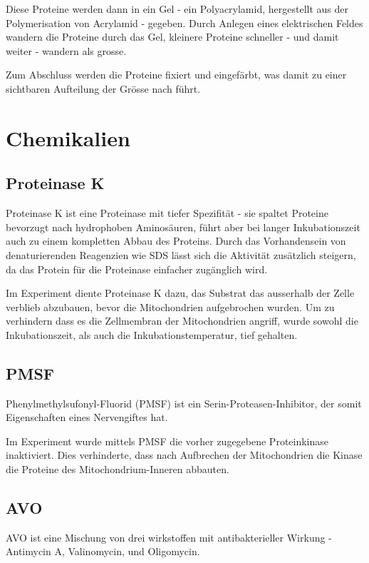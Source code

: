 \documentclass[a4paper,german]{scrreprt}
\begin{document}
Diese Proteine werden dann in ein Gel - ein Polyacrylamid, hergestellt aus der
Polymerisation von Acrylamid - gegeben. Durch Anlegen eines elektrischen Feldes
wandern die Proteine durch das Gel, kleinere Proteine schneller - und damit
weiter - wandern als grosse.

Zum Abschluss werden die Proteine fixiert und eingefärbt, was damit zu einer
sichtbaren Aufteilung der Grösse nach führt.

\chapter{Chemikalien}

\section{Proteinase K}

Proteinase K ist eine Proteinase mit tiefer Spezifität - sie spaltet Proteine
bevorzugt nach hydrophoben Aminosäuren, führt aber bei langer Inkubationszeit
auch zu einem kompletten Abbau des Proteins. Durch das Vorhandensein von
denaturierenden Reagenzien wie SDS lässt sich die Aktivität zusätzlich
steigern, da das Protein für die Proteinase einfacher zugänglich wird. \cite{stimulation_proteinase}

Im Experiment diente Proteinase K dazu, das Substrat das ausserhalb der Zelle
verblieb abzubauen, bevor die Mitochondrien aufgebrochen wurden. Um zu
verhindern dass es die Zellmembran der Mitochondrien angriff, wurde sowohl die
Inkubationszeit, als auch die Inkubationstemperatur, tief gehalten.

\section{PMSF}

Phenylmethylsufonyl-Fluorid (PMSF) ist ein Serin-Proteasen-Inhibitor, der somit
Eigenschaften eines Nervengiftes hat.

Im Experiment wurde mittels PMSF die vorher zugegebene Proteinkinase
inaktiviert. Dies verhinderte, dass nach Aufbrechen der Mitochondrien die
Kinase die Proteine des Mitochondrium-Inneren abbauten.

\section{AVO}

AVO ist eine Mischung von drei wirkstoffen mit antibakterieller Wirkung -
Antimycin A, Valinomycin, und Oligomycin.
\end{document}
